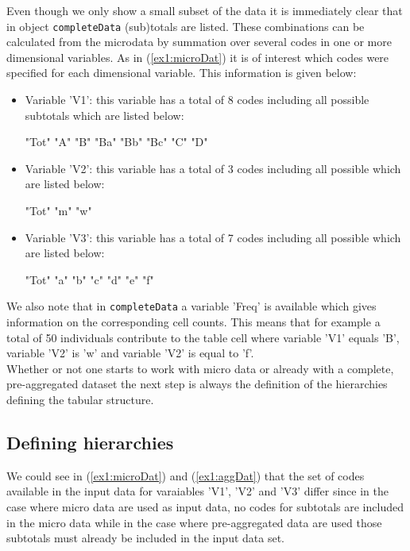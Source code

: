 \documentclass{article}
\begin{document}
Even though we only show a small subset of the data it is immediately clear that 
in object {\tt completeData} (sub)totals are listed. These combinations can be 
calculated from the microdata by summation over several codes in one or more
dimensional variables. As in (\ref{ex1:microDat}) it is of interest which codes
were specified for each dimensional variable. This information is given below:
\begin{itemize}
	\item Variable 'V1': this variable has a total of 8 
	codes including all possible subtotals which are listed below:
\begin{Schunk}
\begin{Soutput}
[1] "Tot" "A"   "B"   "Ba"  "Bb"  "Bc"  "C"   "D"  
\end{Soutput}
\end{Schunk}
	\item Variable 'V2': this variable has a total of 3 
	codes including all possible which are listed below:
\begin{Schunk}
\begin{Soutput}
[1] "Tot" "m"   "w"  
\end{Soutput}
\end{Schunk}
	\item Variable 'V3': this variable has a total of 7 
	codes including all possible which are listed below:
\begin{Schunk}
\begin{Soutput}
[1] "Tot" "a"   "b"   "c"   "d"   "e"   "f"  
\end{Soutput}
\end{Schunk}
\end{itemize}

We also note that in {\tt completeData} a variable 'Freq' is available which 
gives information on the corresponding cell counts. This means that for example
a total of 50 individuals contribute to the table cell where variable
'V1' equals 'B', variable 'V2' is 'w' and variable 'V2' is
equal to 'f'. \\

Whether or not one starts to work with micro data or already with a complete, 
pre-aggregated dataset the next step is always the definition of the hierarchies
defining the tabular structure. 

\subsection{Defining hierarchies}\label{ex1:hier} 
We could see in (\ref{ex1:microDat}) and (\ref{ex1:aggDat}) that the set of codes
available in the input data for varaiables 'V1', 'V2' and 'V3' differ since in
the case where micro data are used as input data, no codes for subtotals are 
included in the micro data while in the case where pre-aggregated data are used 
those subtotals must already be included in the input data set. \\
\end{document}
